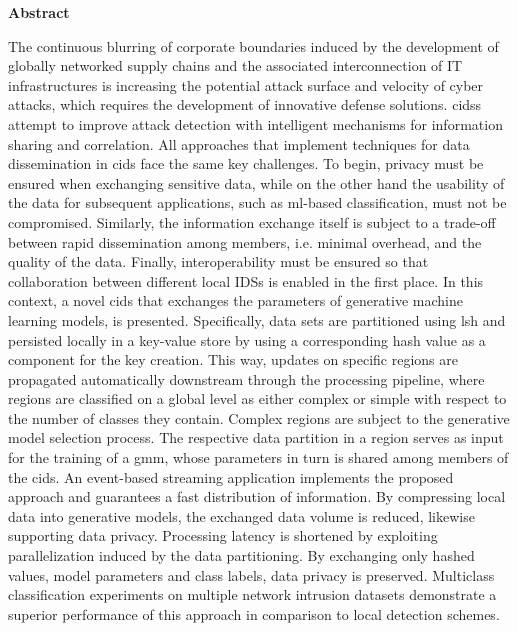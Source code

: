 \documentclass[../main.tex]{subfiles}
\begin{document}
\begingroup

\hspace{0pt}
\vfill
\begin{adjustwidth}{1.7cm}{1.7cm}
\begin{center}
    \normalsize\textbf{Abstract}
\end{center}
\par\medskip

The continuous blurring of corporate boundaries induced by the development of globally networked supply chains and the associated interconnection of IT infrastructures is increasing the potential attack surface and velocity of cyber attacks, which requires the development of innovative defense solutions.
\glspl{cids} attempt to improve attack detection with intelligent mechanisms for information sharing and correlation.
All approaches that implement techniques for data dissemination in \gls{cids} face the same key challenges.
To begin, privacy must be ensured when exchanging sensitive data, while on the other hand the usability of the data for subsequent applications, such as \gls{ml}-based classification, must not be compromised. 
Similarly, the information exchange itself is subject to a trade-off between rapid dissemination among members, i.e. minimal overhead, and the quality of the data.
Finally, interoperability must be ensured so that collaboration between different local IDSs is enabled in the first place.
In this context, a novel \gls{cids} that exchanges the parameters of generative machine learning models, is presented. 
Specifically, data sets are partitioned using \gls{lsh} and persisted locally in a key-value store by using a corresponding hash value as a component for the key creation.
This way, updates on specific regions are propagated automatically downstream through the processing pipeline, where regions are classified on a global level as either complex or simple with respect to the number of classes they contain.
Complex regions are subject to the generative model selection process. The respective data partition in a region serves as input for the training of a \gls{gmm}, whose parameters in turn is shared among members of the \gls{cids}.
An event-based streaming application implements the proposed approach and guarantees a fast distribution of information.
By compressing local data into generative models, the exchanged data volume is reduced, likewise supporting data privacy.
Processing latency is shortened by exploiting parallelization induced by the data partitioning.
By exchanging only hashed values, model parameters and class labels, data privacy is preserved. 
Multiclass classification experiments on multiple network intrusion datasets demonstrate a superior performance of this approach in comparison to local detection schemes.
\end{adjustwidth}
\vfill
\hspace{0pt}
\par\endgroup
\bigskip\noindent
\end{document}
